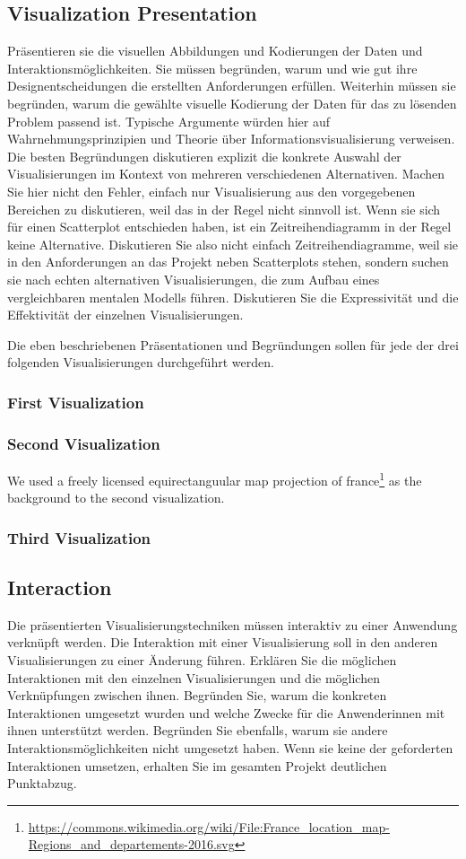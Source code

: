 \documentclass[usegeometry=true]{scrartcl}
\begin{document}
\subsection{Visualization Presentation}
Präsentieren sie die visuellen Abbildungen und Kodierungen der Daten und Interaktionsmöglichkeiten.
Sie müssen begründen, warum und wie gut ihre Designentscheidungen die erstellten Anforderungen erfüllen.
Weiterhin müssen sie begründen, warum die gewählte visuelle Kodierung der Daten für das zu lösenden Problem passend ist.
Typische Argumente würden hier auf Wahrnehmungsprinzipien und Theorie über Informationsvisualisierung verweisen. 
Die besten Begründungen diskutieren explizit die konkrete Auswahl der Visualisierungen im Kontext von mehreren verschiedenen Alternativen. 
Machen Sie hier nicht den Fehler, einfach nur Visualisierung aus den vorgegebenen Bereichen zu diskutieren, weil das in der Regel nicht sinnvoll ist.
Wenn sie sich für einen Scatterplot entschieden haben, ist ein Zeitreihendiagramm in der Regel keine Alternative.
Diskutieren Sie also nicht einfach Zeitreihendiagramme, weil sie in den Anforderungen an das Projekt neben Scatterplots stehen, sondern suchen sie nach echten alternativen Visualisierungen, die zum Aufbau eines vergleichbaren mentalen Modells führen.
Diskutieren Sie die Expressivität und die Effektivität der einzelnen Visualisierungen.

Die eben beschriebenen Präsentationen und Begründungen sollen für jede der drei folgenden Visualisierungen durchgeführt werden. 
\subsubsection{First Visualization}
\subsubsection{Second Visualization}
We used a freely licensed equirectanguular map projection of france\footnote{\url{https://commons.wikimedia.org/wiki/File:France_location_map-Regions_and_departements-2016.svg}} as the background to the second visualization.
\subsubsection{Third Visualization}

\subsection{Interaction}
Die präsentierten Visualisierungstechniken müssen interaktiv zu einer Anwendung verknüpft werden.
Die Interaktion mit einer Visualisierung soll in den anderen Visualisierungen zu einer Änderung führen. 
Erklären Sie die möglichen Interaktionen mit den einzelnen Visualisierungen und die möglichen Verknüpfungen zwischen ihnen. Begründen Sie, warum die konkreten Interaktionen umgesetzt wurden und welche Zwecke für die Anwenderinnen mit ihnen unterstützt werden. Begründen Sie ebenfalls, warum sie andere Interaktionsmöglichkeiten nicht umgesetzt haben. Wenn sie keine der geforderten Interaktionen umsetzen, erhalten Sie im gesamten Projekt deutlichen Punktabzug.
\end{document}
